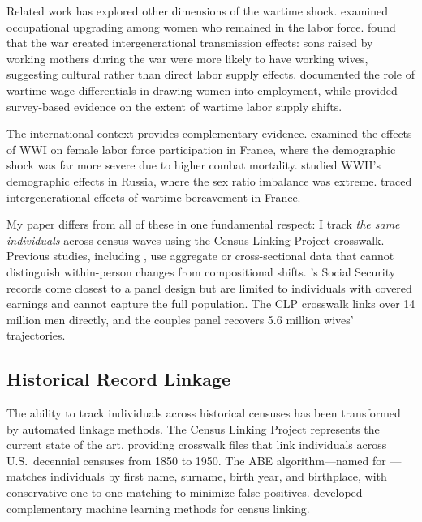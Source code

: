 \documentclass[12pt]{article}
\begin{document}
Related work has explored other dimensions of the wartime shock. \citet{bellou2016occupations} examined occupational upgrading among women who remained in the labor force. \citet{fernandez2004mothers} found that the war created intergenerational transmission effects: sons raised by working mothers during the war were more likely to have working wives, suggesting cultural rather than direct labor supply effects. \citet{mulligan1998pecuniary} documented the role of wartime wage differentials in drawing women into employment, while \citet{nix2022maternal} provided survey-based evidence on the extent of wartime labor supply shifts.

The international context provides complementary evidence. \citet{gay2022missing} examined the effects of WWI on female labor force participation in France, where the demographic shock was far more severe due to higher combat mortality. \citet{brainerd2017lasting} studied WWII's demographic effects in Russia, where the sex ratio imbalance was extreme. \citet{boehnke2020war} traced intergenerational effects of wartime bereavement in France.

My paper differs from all of these in one fundamental respect: I track \textit{the same individuals} across census waves using the Census Linking Project crosswalk. Previous studies, including \citeauthor{acemoglu2004women}, use aggregate or cross-sectional data that cannot distinguish within-person changes from compositional shifts. \citeauthor{rose2018rise}'s Social Security records come closest to a panel design but are limited to individuals with covered earnings and cannot capture the full population. The CLP crosswalk links over 14 million men directly, and the couples panel recovers 5.6 million wives' trajectories.

\subsection{Historical Record Linkage}

The ability to track individuals across historical censuses has been transformed by automated linkage methods. The Census Linking Project \citep{abramitzky2025clp} represents the current state of the art, providing crosswalk files that link individuals across U.S.\ decennial censuses from 1850 to 1950. The ABE algorithm---named for \citet{abramitzky2012europe, abramitzky2014nation}---matches individuals by first name, surname, birth year, and birthplace, with conservative one-to-one matching to minimize false positives. \citet{feigenbaum2016automated} developed complementary machine learning methods for census linking.
\end{document}
